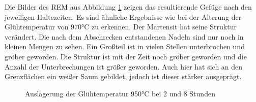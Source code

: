 \documentclass[a4paper, 11pt]{tubsreprt}
\begin{document}
Die Bilder des REM aus Abbildung \ref{REM 950 2 und 8} zeigen das resultierende Gefüge nach den jeweiligen Haltezeiten. Es sind ähnliche Ergebnisse wie bei der Alterung der Glühtemperatur von 970°C zu erkennen. Der Martensit hat seine Struktur verändert. Die nach dem Abschrecken entstandenen Nadeln sind nur noch in kleinen Mengen zu sehen. Ein Großteil ist in vielen Stellen unterbrochen und gröber geworden. Die Struktur ist mit der Zeit noch gröber geworden und die Anzahl der Unterbrechungen ist größer geworden. Auch hier hat sich an den Grenzflächen ein weißer Saum gebildet,  jedoch ist dieser stärker ausgeprägt.
\begin{figure}
\label{REM 950 2 und 8}
\caption{Auslagerung der Glühtemperatur 950°C bei 2 und 8 Stunden}
\end{figure}
\end{document}
